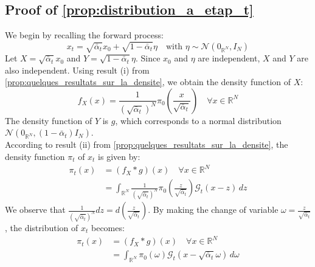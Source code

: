 \documentclass[a4paper,10pt]{article}
\theoremstyle{definition} %
\theoremstyle{definition} %
\theoremstyle{definition} %
\theoremstyle{definition} %
\newcommand{\R}{\mathbb{R}}
\newcommand{\E}[1]{\mathbb{E} \left[ {#1} \right] }
\newcommand{\0}{\boldsymbol{0}}
\begin{document}
\subsection{Proof of \cref{prop:distribution_a_etap_t}} \label{sec:proof_distribution_a_etap_t}
We begin by recalling the forward process:
\begin{equation*}
x_t = \sqrt{\bar{\alpha}_t} x_0 + \sqrt{1 - \bar{\alpha}_t} \eta \quad \text{with } \eta \sim \mathcal{N}(0_{\mathbb{R}^N}, I_N)
\end{equation*}
Let $X = \sqrt{\bar{\alpha}_t} x_0$ and $Y = \sqrt{1 - \bar{\alpha}_t} \eta$. Since $x_0$ and $\eta$ are independent, $X$ and $Y$ are also independent. Using result (i) from \cref{prop:quelques_resultats_sur_la_densite}, we obtain the density function of $X$:
\begin{equation*}
f_X(x) = \frac{1}{(\sqrt{\bar{\alpha}_t})^N} \pi_0\left(\frac{x}{\sqrt{\bar{\alpha}_t}}\right) \quad \forall x \in \mathbb{R}^N
\end{equation*}
The density function of $Y$ is $g$, which corresponds to a normal distribution $\mathcal{N}(0_{\mathbb{R}^N}, (1 - \bar{\alpha}_t) I_N)$.
\\According to result (ii) from \cref{prop:quelques_resultats_sur_la_densite}, the density function $\pi_t$ of $x_t$ is given by:
\begin{align*}
\pi_t(x) &= (f_X * g)(x) \quad \forall x \in \mathbb{R}^N \\
&= \int_{\mathbb{R}^N} \frac{1}{(\sqrt{\bar{\alpha}_t})^N} \pi_0\left(\frac{z}{\sqrt{\bar{\alpha}_t}}\right) \mathcal{G}_t(x - z) \, dz
\end{align*}
We observe that $\frac{1}{(\sqrt{\bar{\alpha}_t})^N} dz = d\left(\frac{z}{\sqrt{\bar{\alpha}_t}}\right)$. By making the change of variable $\omega = \frac{z}{\sqrt{\bar{\alpha}_t}}$, the distribution of $x_t$ becomes:
\begin{align*}
\pi_t(x) &= (f_X * g)(x) \quad \forall x \in \mathbb{R}^N \\
&= \int_{\mathbb{R}^N} \pi_0(\omega) \mathcal{G}_t(x - \sqrt{\bar{\alpha}_t} \omega) \, d\omega
\end{align*}

\end{document}
